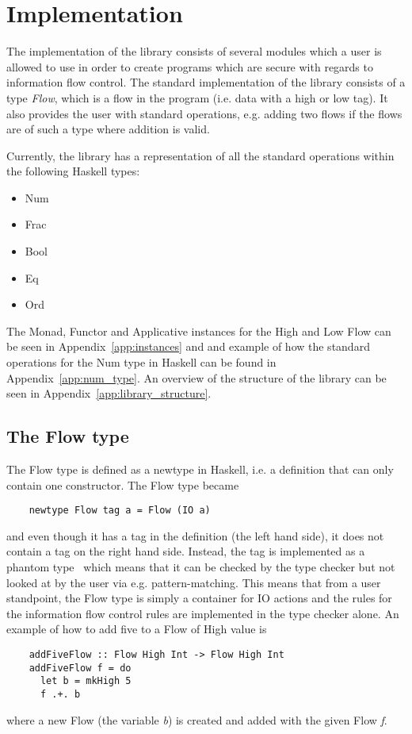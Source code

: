 \chapter{Implementation}
\label{chapter:implementation}
The implementation of the library consists of several modules which a user is allowed to use in order to create programs which are secure with regards to information flow control. The standard implementation of the library consists of a type \emph{Flow}, which is a flow in the program (i.e. data with a high or low tag). It also provides the user with standard operations, e.g. adding two flows if the flows are of such a type where addition is valid.

Currently, the library has a representation of all the standard operations within the following Haskell types:
\begin{itemize}
  \item Num
  \item Frac
  \item Bool
  \item Eq
  \item Ord
\end{itemize}

The Monad, Functor and Applicative instances for the High and Low Flow can be seen in Appendix~\ref{app:instances} and and example of how the standard operations for the Num type in Haskell can be found in Appendix~\ref{app:num_type}. An overview of the structure of the library can be seen in Appendix~\ref{app:library_structure}.
\section{The Flow type}
\label{sec:flow}
The Flow type is defined as a newtype in Haskell, i.e. a definition that can only contain one constructor. The Flow type became
\begin{verbatim}
    newtype Flow tag a = Flow (IO a)
\end{verbatim}
and even though it has a tag in the definition (the left hand side), it does not contain a tag on the right hand side. Instead, the tag is implemented as a phantom type~\cite{haskell_phantom} which means that it can be checked by the type checker but not looked at by the user via e.g. pattern-matching. This means that from a user standpoint, the Flow type is simply a container for IO actions and the rules for the information flow control rules are implemented in the type checker alone. An example of how to add five to a Flow of High value is
\begin{verbatim}
    addFiveFlow :: Flow High Int -> Flow High Int
    addFiveFlow f = do
      let b = mkHigh 5
      f .+. b
\end{verbatim}
where a new Flow (the variable \emph{b}) is created and added with the given Flow \emph{f}.

